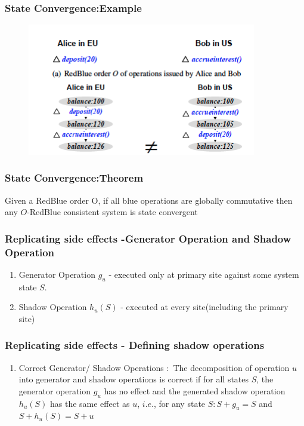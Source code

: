 \documentclass{beamer}
\begin{document}
\begin{frame}
\frametitle{State Convergence:Example }
\begin{figure}[t]
\includegraphics[width=10cm]{pic5.jpg}
\centering
\end{figure}
\end{frame}



\begin{frame}
\frametitle{State Convergence:Theorem }
\begin{theorem}
Given a RedBlue order O, if all blue operations are globally commutative then any $O$-RedBlue consistent system is state convergent
\end{theorem}

\end{frame}



\begin{frame}
\frametitle{Replicating side effects -Generator Operation and Shadow Operation}
\begin{enumerate}
\item Generator Operation $g_u$ - executed only at primary site against some system state $S$.
\item Shadow Operation $h_u(S)$ - executed at every site(including the primary site)
\end{enumerate}
\end{frame}



\begin{frame}
\frametitle{Replicating side effects - Defining shadow operations}
\begin{enumerate}
\item Correct Generator/ Shadow Operations $\colon$ The decomposition of operation $u$ into generator and shadow operations is correct if for all states $S$, the generator operation $g_u$ has no effect and the generated shadow operation $h_u(S)$ has the same effect as $u$, $i.e.$, for any state $S: S + g_u = S$ and $S + h_u(S) = S + u$
\end{enumerate}

\end{frame}
\end{document}
